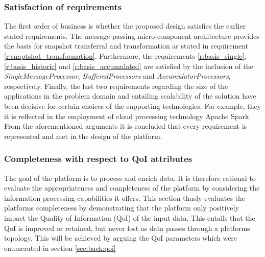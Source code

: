 \subsubsection*{Satisfaction of requirements}
The first order of business is whether the proposed design satisfies the earlier stated requirements. The message-passing micro-component architecture provides the basis for snapshot transferral and transformation as stated in requirement \ref{r:snaptshot_transformation}. Furthermore, the requirements \ref{r:basis_single}, \ref{r:basis_historic} and \ref{r:basis_accumulated} are satisfied by the inclusion of the \emph{SingleMessageProcessor}, \emph{BufferedProcessors} and \emph{AccumulatorProcessors}, respectively. Finally, the last two requirements regarding the size of the applications in the problem domain and entailing scalability of the solution have been decisive for certain choices of the supporting technologies. For example, they it is reflected in the employment of cloud processing technology Apache Spark. From the aforementioned arguments it is concluded that every requirement is represented and met in the design of the platform.

\subsubsection*{Completeness with respect to QoI attributes}
The goal of the platform is to process and enrich data. It is therefore rational to evaluate the appropriateness and completeness of the platform by considering the information processing capabilities it offers. This section thusly evaluates the platforms completeness by demonstrating that the platform only positively impact the Quality of Information (QoI) of the input data. This entails that the QoI is improved or retained, but never lost as data passes through a platforms topology. This will be achieved by arguing the QoI parameters which were enumerated in section \ref{sec:back:qoi}

